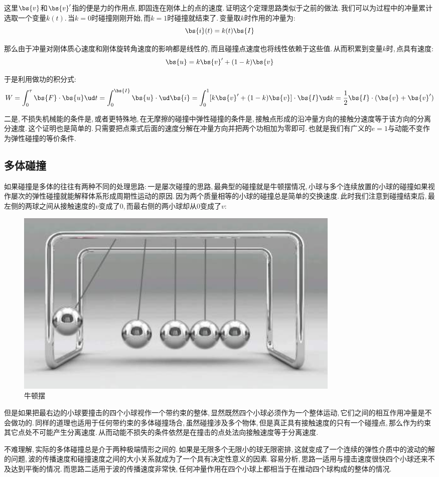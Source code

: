 这里$\bs{v}$和$\bs{v}'$指的便是力的作用点,\,即固连在刚体上的点的速度.\,证明这个定理思路类似于之前的做法.\,我们可以为过程中的冲量累计选取一个变量$k(t)$.\,当$k=0$时碰撞刚刚开始,\,而$k=1$时碰撞就结束了.\,变量取$k$时作用的冲量为:
\[\bs{i}(t)=k(t)\bs{I}\]

那么由于冲量对刚体质心速度和刚体旋转角速度的影响都是线性的,\,而且碰撞点速度也将线性依赖于这些值.\,从而积累到变量$k$时,\,点具有速度:
\[\bs{u}=k\bs{v}'+(1-k)\bs{v}\]

于是利用做功的积分式:
\[W=\int_0^\tau \bs{F}\cdot \bs{u}\ud t=\int_0^{\bs{I}} \bs{u}\cdot \ud \bs{i}=\int_0^1[k\bs{v}'+(1-k)\bs{v}]\cdot\bs{I}\ud k=\frac{1}{2}\bs{I}\cdot(\bs{v}+\bs{v}')\]

二是,\,不损失机械能的条件是,\,或者更特殊地,\,在无摩擦的碰撞中弹性碰撞的条件是,\,接触点形成的沿冲量方向的接触分速度等于该方向的分离分速度.\,这个证明也是简单的.\,只需要把点乘式后面的速度分解在冲量方向并把两个功相加为零即可.\,也就是我们有广义的$e=1$与动能不变作为弹性碰撞的等价条件.


\subsection{多体碰撞}
如果碰撞是多体的往往有两种不同的处理思路:\,一是屡次碰撞的思路,\,最典型的碰撞就是牛顿摆情况,\,小球与多个连续放置的小球的碰撞如果视作屡次的弹性碰撞就能解释体系形成周期性运动的原因.\,因为两个质量相等的小球的碰撞总是简单的交换速度.\,此时我们注意到碰撞结束后,\,最左侧的两球之间从接触速度的$v$变成了$0$,\,而最右侧的两小球却从$0$变成了$v$:
\begin{figure}[H]
\centering
\includegraphics[width=16cm]{image/6-1-14}
\caption{牛顿摆}
\end{figure}

但是如果把最右边的小球要撞击的四个小球视作一个带约束的整体,\,显然既然四个小球必须作为一个整体运动,\,它们之间的相互作用冲量是不会做功的.\,同样的道理也适用于任何带约束的多体碰撞场合,\,虽然碰撞涉及多个物体,\,但是真正具有接触速度的只有一个碰撞点,\,那么作为约束其它点处不可能产生分离速度.\,从而动能不损失的条件依然是在撞击的点处法向接触速度等于分离速度.

不难理解,\,实际的多体碰撞总是介于两种极端情形之间的.\,如果是无限多个无限小的球无限密排,\,这就变成了一个连续的弹性介质中的波动的解的问题,\,波的传播速度和碰撞速度之间的大小关系就成为了一个具有决定性意义的因素.\,容易分析,\,思路一适用与撞击速度很快四个小球还来不及达到平衡的情况.\,而思路二适用于波的传播速度非常快,\,任何冲量作用在四个小球上都相当于在推动四个球构成的整体的情况.

